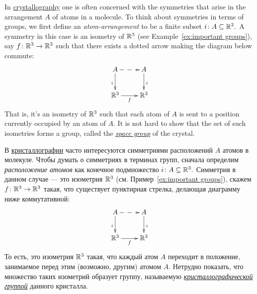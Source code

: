 \documentclass[../main/CT4S-EN-RU]{subfiles}
\begin{document}
\begin{applicationENG}\label{app:groups for symmetry}
In \href{http://en.wikipedia.org/wiki/Crystallography}{\text crystallography} one is often concerned with the symmetries that arise in the arrangement $A$ of atoms in a molecule. To think about symmetries in terms of groups, we first define an {\em atom-arrangement} to be a finite subset $i\colon A\subseteq{\mathbb R}^3.$ A symmetry in this case is an isometry of ${\mathbb R}^3$ (see Example~\ref{ex:important groups}), say $f\colon{\mathbb R}^3\rightarrow{\mathbb R}^3$ such that there exists a dotted arrow making the diagram below commute:
$$
\xymatrix{A\ar@{-->}[r]\ar[d]_i&A\ar[d]^i\\\RR^3\ar[r]_f&\RR^3}
$$
That is, it's an isometry of ${\mathbb R}^3$ such that each atom of $A$ is sent to a position currently occupied by an atom of $A.$ It is not hard to show that the set of such isometries forms a group, called the \href{http://en.wikipedia.org/wiki/Space_group}{\em space group} of the crystal.
\end{applicationENG}

\begin{applicationRUS}\label{app:groups for symmetry}
В \href{https://ru.wikipedia.org/wiki/%D0%9A%D1%80%D0%B8%D1%81%D1%82%D0%B0%D0%BB%D0%BB%D0%BE%D0%B3%D1%80%D0%B0%D1%84%D0%B8%D1%8F}{\text кристаллографии} часто интересуются симметриями расположений $A$ атомов в молекуле. Чтобы думать о симметриях в терминах групп, сначала определим {\em расположение атомов} как конечное подмножество $i\colon A\subseteq{\mathbb R}^3.$ Симметрия в данном случае — это изометрия ${\mathbb R}^3$ (см. Пример~\ref{ex:important groups}), скажем $f\colon{\mathbb R}^3\rightarrow{\mathbb R}^3$ такая, что существует пунктирная стрелка, делающая диаграмму ниже коммутативной:
$$
\xymatrix{A\ar@{-->}[r]\ar[d]_i&A\ar[d]^i\\\RR^3\ar[r]_f&\RR^3}
$$
То есть, это изометрия ${\mathbb R}^3$ такая, что каждый атом $A$ переходит в положение, занимаемое перед этим (возможно, другим) атомом $A.$ Нетрудно показать, что множество таких изометрий образует группу, называемую \href{https://ru.wikipedia.org/wiki/%D0%9A%D1%80%D0%B8%D1%81%D1%82%D0%B0%D0%BB%D0%BB%D0%BE%D0%B3%D1%80%D0%B0%D1%84%D0%B8%D1%87%D0%B5%D1%81%D0%BA%D0%B0%D1%8F_%D0%B3%D1%80%D1%83%D0%BF%D0%BF%D0%B0}{\em кристаллографической группой}\index{кристаллографическая группа} данного кристалла.
\end{applicationRUS}
\end{document}
